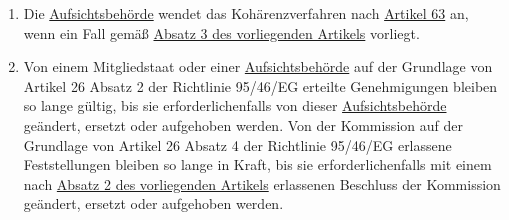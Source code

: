 \begin{enumerate}
  \item Die \hyperref[itm:04-21]{Aufsichtsbehörde} wendet das Kohärenzverfahren nach \hyperref[ch:63]{Artikel 63} an,
   wenn ein Fall gemäß
   \hyperref[itm:46-3]{Absatz 3 des vorliegenden Artikels} vorliegt.%
  \label{itm:46-4}

  \item Von einem Mitgliedstaat oder einer \hyperref[itm:04-21]{Aufsichtsbehörde} auf der Grundlage von Artikel 26
   Absatz 2 der Richtlinie 95/46/EG erteilte Genehmigungen bleiben so
   lange gültig, bis sie erforderlichenfalls von dieser \hyperref[itm:04-21]{Aufsichtsbehörde} geändert, ersetzt oder
   aufgehoben werden. Von der Kommission auf der Grundlage von Artikel 26 Absatz 4 der Richtlinie 95/46/EG erlassene
   Feststellungen bleiben so lange in Kraft, bis sie erforderlichenfalls mit einem nach \hyperref[itm:46-2]{Absatz 2
   des vorliegenden Artikels} erlassenen Beschluss der Kommission geändert, ersetzt oder aufgehoben werden.%
  \label{itm:46-5}

\end{enumerate}


